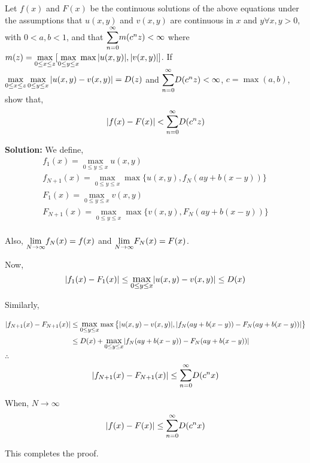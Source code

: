 \begin{example}
Let $f(x)$ and $F(x)$ be the continuous solutions of the above equations under the assumptions that $u(x, y)$ and $v (x,y)$ are continuous in $x$ and $y \forall x,y >0$, with $0 <a,b <1$, and that $\bigsum_{n=0}^\infty m(c^nz) < \infty$ where 
$m(z) = \mathlarger{\max_{0\le x \le z} [\max_{0 \le y \le x} \max {| u(x, y) |, | v(x, y) |}]}$.
If $\mathlarger{\max_{0\le x \le z} {\max_{0\le y \le x } |u(x,y)-v(x,y)|}=D(z)}$ and $\bigsum_{n=0}^\infty D(c^nz) < \infty$, $c=\max (a, b)$, show that,
$$
|f(x)-F(x)| < \bigsum_{n=0}^\infty D(c^nz)
$$

\vspace{5mm}
\textbf{Solution:} We define, 
\begin{align*}
    f_1(x) = \max_{0\le y \le x} u(x, y) \\
    f_{N+1}(x) = \max_{0\le y \le x} \max \big\{ u(x, y), f_N(ay+b(x-y)) \big\} \\
    F_1(x) = \max_{0\le y \le x} v(x, y) \\
    F_{N+1}(x) = \max_{0\le y \le x} \max \big\{ v(x, y), F_N(ay+b(x-y)) \big\} \\
\end{align*}

Also, $\mathlarger{\lim_{N \to \infty}} f_N(x) = f(x)$ and $\mathlarger{\lim_{N \to \infty}} F_N(x) = F(x)$.

Now, 
$$
|f_1(x) - F_1(x)| \le \mathlarger{\max_{0\le y \le x}} |u(x, y) - v(x, y)| \le D(x)
$$

Similarly,

\begin{align*}
    |f_{N+1}(x) - F_{N+1}(x)| &\le \mathlarger{\max_{0\le y \le x}} \max \big\{ |u(x, y) - v(x, y)|, |f_N(ay+b(x-y)) - F_N(ay+b(x-y))| \big\} \\
    &\le D(x) + \mathlarger{\max_{0\le y \le x}} |f_N(ay+b(x-y)) - F_N(ay+b(x-y))|
\end{align*}
\vspace{-5mm}
$\therefore$
\vspace{-5mm}
$$
|f_{N+1}(x) - F_{N+1}(x)| \le \bigsum_{n=0}^\infty D(c^nx)
$$

When, $N \to \infty$
\vspace{-5mm}
$$
|f(x) - F(x)| \le \bigsum_{n=0}^\infty D(c^nx)
$$

This completes the proof.
\end{example}
